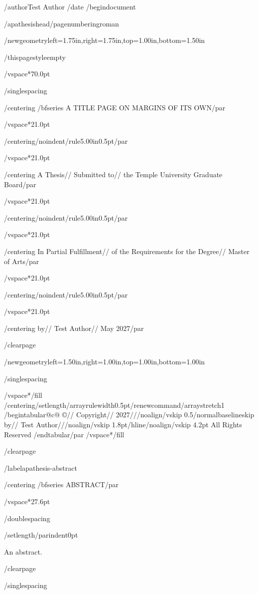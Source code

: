 /author{Test Author}
/date{}
/begin{document}


/apathesishead/pagenumbering{roman}

/newgeometry{left=1.75in,right=1.75in,top=1.00in,bottom=1.50in}

/thispagestyle{empty}

/vspace*{70.0pt}

/singlespacing

{/centering
/bfseries A TITLE PAGE ON MARGINS OF ITS OWN/par}

/vspace*{21.0pt}

{/centering/noindent/rule{5.00in}{0.5pt}/par}

/vspace*{21.0pt}

{/centering
A Thesis//
Submitted to//
the Temple University Graduate Board/par}

/vspace*{21.0pt}

{/centering/noindent/rule{5.00in}{0.5pt}/par}

/vspace*{21.0pt}

{/centering
In Partial Fulfillment//
of the Requirements for the Degree//
Master of Arts/par}

/vspace*{21.0pt}

{/centering/noindent/rule{5.00in}{0.5pt}/par}

/vspace*{21.0pt}

{/centering
by//
Test Author//
May 2027/par}

/clearpage

/newgeometry{left=1.50in,right=1.00in,top=1.00in,bottom=1.00in}

/singlespacing

/vspace*{/fill}
{/centering/setlength{/arrayrulewidth}{0.5pt}/renewcommand{/arraystretch}{1}
/begin{tabular}{@{}c@{}}
©//
Copyright//
2027///noalign{/vskip 0.5/normalbaselineskip}
by//
Test Author///noalign{/vskip 1.8pt}/hline/noalign{/vskip 4.2pt}
All Rights Reserved
/end{tabular}/par}
/vspace*{/fill}

/clearpage

/label{apathesis-abstract}

{/centering
/bfseries ABSTRACT/par}

/vspace*{27.6pt}

/doublespacing

{/setlength{/parindent}{0pt}

An abstract.

}

/clearpage

/singlespacing

